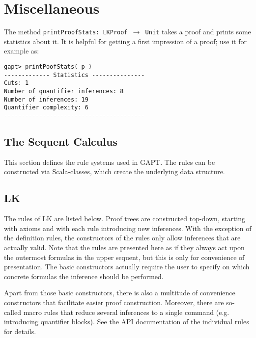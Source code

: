 \documentclass[a4paper,11pt]{article}
\begin{document}
\section{Miscellaneous}

The method \texttt{printProofStats: LKProof $\rightarrow$ Unit}
takes a proof and prints some statistics about it. It is helpful
for getting a first impression of a proof; use it for example as:

\begin{lstlisting}
gapt> printPoofStats( p )
------------- Statistics ---------------
Cuts: 1
Number of quantifier inferences: 8
Number of inferences: 19
Quantifier complexity: 6
----------------------------------------
\end{lstlisting}

\vfill
\pagebreak
\begin{appendix}

\section{The Sequent Calculus}\label{app:sequent_calculus}

This section defines the rule systems used in GAPT. The rules can be constructed
via Scala-classes, which create the underlying data structure.

\subsection{LK}


The rules of LK are listed below. Proof trees are constructed top-down, starting with axioms and with each rule introducing new inferences. With the exception of the definition rules, the constructors of the rules only allow inferences that are actually valid. Note that the rules are presented here as if they always act upon the outermost formulas in the upper sequent, but this is only for convenience of presentation. The basic constructors actually require the user to specify on which concrete formulas the inference should be performed.

Apart from those basic constructors, there is also a multitude of convenience constructors that facilitate easier proof construction. Moreover, there are so-called macro rules that reduce several inferences to a single command (e.g. introducing quantifier blocks). See the API documentation of the individual rules for details. 


\end{appendix}
\end{document}
